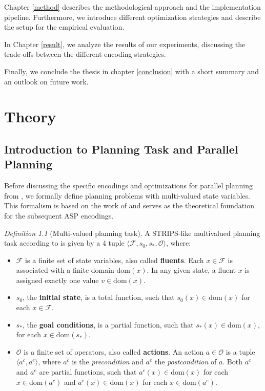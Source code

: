 \documentclass[
     11pt,                    %
     a4paper,             %
     BCOR=10mm,     %
     DIV=14,                 %
     listof=totoc,                    %
     bibliography=totoc,       %
     index=totoc,              %
     parskip            %
     twoside,
     headsepline
     ]{scrreprt}
\theoremstyle{definition}
\theoremstyle{definition}
\theoremstyle{remark}
\theoremstyle{bfnote}
\newtheorem{defi}{Definition}
\newcommand{\dom}{\mathrm{dom}}
\begin{document}
Chapter \ref{method} describes the methodological approach and the implementation pipeline. Furthermore, we introduce different optimization strategies and describe the setup for the empirical evaluation.

In Chapter \ref{result}, we analyze the results of our experiments, discussing the trade-offs between the different encoding strategies.

Finally, we conclude the thesis in chapter \ref{conclusion} with a short summary and an outlook on future work.


\chapter{Theory}\label{theory}
\section{Introduction to Planning Task and Parallel Planning}


Before discussing the specific encodings and optimizations for parallel planning from \textcite{DIMOPOULOS_2019}, 
we formally define planning problems with multi-valued state variables. This formalism is based on the work of \textcite{Helmert_2006,DIMOPOULOS_2019} and serves as the theoretical foundation for the subsequent ASP encodings.

\begin{defi}[Multi-valued planning task]
    \label{def:MVPlan}
    A STRIPS-like multivalued planning task according to \textcite{Helmert_2006} is given by a 4 tuple $\langle \mathcal{F}, s_0, s_*, \mathcal{O} \rangle$, where:
    \begin{itemize}
      \item $\mathcal{F}$ is a finite set of state variables, also called \textbf{fluents}. Each $x \in \mathcal{F}$ is associated with a finite domain $\dom(x)$. In any given state, a fluent $x$ is assigned exactly one value $v \in \dom(x)$.
      \item $s_0$, the \textbf{initial state}, is a total function, such that $s_0(x) \in \dom(x)$ for each $x \in \mathcal{F}$. 
      \item $s_*$, the \textbf{goal conditions}, is a partial function, such that $s_*(x) \in \dom(x)$, for each $x \in \dom(s_*)$.
      \item $\mathcal{O}$ is a finite set of operators, also called \textbf{actions}. An action $a \in \mathcal O$ is a tuple $\langle a^c, a^e \rangle$, where $a^c$ is the \textit{precondition} and $a^e$ the \textit{postcondition} of $a$. 
      Both $a^c$ and $a^e$ are partial functions, such that $a^c(x) \in \dom(x)$ for each $x \in \dom(a^c)$ and $a^e(x) \in \dom(x)$ for each $x \in \dom(a^e)$.
    \end{itemize}
\end{defi}
\end{document}
